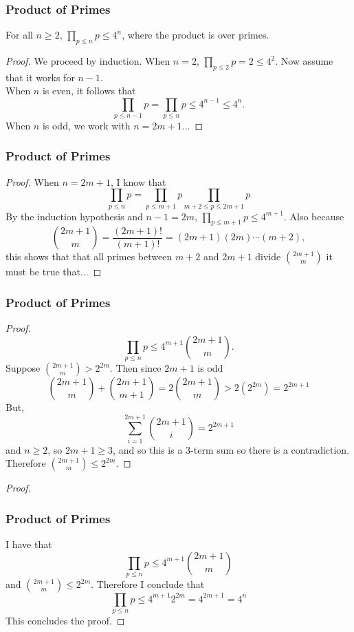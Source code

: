 \documentclass{beamer}
\begin{document}
\begin{frame}
\frametitle{Product of Primes}
\begin{corollary}[3]
\normalfont For all $n \geq 2$, $\displaystyle\prod_{p \leq n} p \leq 4^n$, where the product is over primes.
\end{corollary}
\pause
\begin{proof}\renewcommand{\qedsymbol}{}
We proceed by induction. When $n = 2$, $\displaystyle\prod_{p\leq2} p = 2 \leq 4^2.$ Now assume that it works for $n-1$.
\pause
\ \\
When $n$ is even, it follows that
$$\prod_{p \leq n-1} p = \prod_{p \leq n} p \leq 4^{n-1} \leq 4^n.$$
When $n$ is odd, we work with $n = 2m +1...$
\end{proof}
\end{frame}

\begin{frame}
\frametitle{Product of Primes}
\begin{proof}\renewcommand{\qedsymbol}{}
When $n = 2m + 1$, I know that
\pause
$$\prod_{p \leq n}p = \prod_{p\leq m+1}p  \prod_{m+2 \leq p \leq 2m + 1}p$$
\pause
By the induction hypothesis and $n-1 = 2m$, $\displaystyle\prod_{p\leq m+1}p \leq 4^{m+1}$. \pause Also because\vspace{-.3cm}
$${2m+1 \choose m} = \frac{(2m+1)!}{(m+1)!} = (2m+1)(2m)\cdots (m+2),$$
this shows that that all primes between $m+2$ and $2m + 1$ divide ${2m +1 \choose m}$ it must be true that...

\end{proof}
\end{frame}

\begin{frame}
\frametitle{Product of Primes}
\begin{proof}\renewcommand{\qedsymbol}{}
$$\prod_{p\leq n}p \leq 4^{m+1} {2m+1 \choose m}.$$
\pause
Suppose ${2m+1 \choose m} > 2^{2m}.$ 
\pause
Then since $2m +1$ is odd 
$${2m+1 \choose m} + {2m+1 \choose m +1} = 2{2m+1 \choose m} > 2(2^{2m}) = 2^{2m + 1}$$
But,
\pause
$$\sum_{i = 1}^{2m +  1} {2m+1 \choose i} = 2^{2m + 1}$$
and $n \geq 2$, so $2m + 1 \geq 3$, and so this is a 3-term sum so there is a contradiction. Therefore ${2m+1 \choose m} \leq 2^{2m}.$
\end{proof}
\end{frame}

\begin{frame}
\begin{proof}
\frametitle{Product of Primes}
I have that 
$$\prod_{p\leq n}p \leq 4^{m+1} {2m+1 \choose m}$$
and ${2m+1 \choose m} \leq 2^{2m}.$ Therefore I conclude that
$$\prod_{p\leq n}p \leq 4^{m+1}  2^{2m} = 4^{2m + 1} = 4^n$$
This concludes the proof.
\end{proof}
\end{frame}
\end{document}
